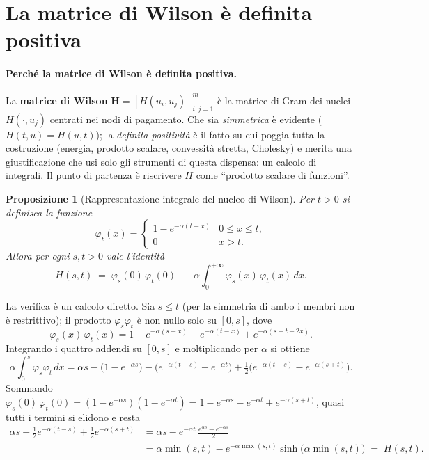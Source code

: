 \documentclass[11pt,a4paper]{article}
\theoremstyle{plain}
\newtheorem{proposizione}[teorema]{Proposizione}
\theoremstyle{definition}
\theoremstyle{remark}
\newcommand{\Hmat}{\mathbf{H}}
\begin{document}
\section{La matrice di Wilson è definita positiva}
\label{sec:dimostrazione}

\paragraph{Perch\'e la matrice di Wilson \`e definita positiva.}
La \textbf{matrice di Wilson} $\Hmat = [H(u_i,u_j)]_{i,j=1}^{m}$ \`e la matrice di Gram dei
nuclei $H(\cdot,u_j)$ centrati nei nodi di pagamento. Che sia \emph{simmetrica} \`e evidente
($H(t,u)=H(u,t)$); la \emph{definita positivit\`a} \`e il fatto su cui poggia tutta la
costruzione (energia, prodotto scalare, convessit\`a stretta, Cholesky) e merita una
giustificazione che usi solo gli strumenti di questa dispensa: un calcolo di integrali.
Il punto di partenza \`e riscrivere $H$ come ``prodotto scalare di funzioni''.

\begin{proposizione}[Rappresentazione integrale del nucleo di Wilson]
\label{prop:H-int}
Per $t>0$ si definisca la funzione
\[
  \varphi_t(x) =
  \begin{cases}
    1-e^{-\alpha(t-x)} & 0\le x\le t,\\[2pt]
    0 & x>t .
  \end{cases}
\]
Allora per ogni $s,t>0$ vale l'identit\`a
\begin{equation}
  H(s,t) \;=\; \varphi_s(0)\,\varphi_t(0)
  \;+\; \alpha\!\int_0^{+\infty}\!\varphi_s(x)\,\varphi_t(x)\,dx .
  \label{eq:H-int}
\end{equation}
\end{proposizione}

La verifica \`e un calcolo diretto. Sia $s\le t$ (per la simmetria di ambo i membri non \`e
restrittivo); il prodotto $\varphi_s\varphi_t$ \`e non nullo solo su $[0,s]$, dove
\[
  \varphi_s(x)\,\varphi_t(x)
  = 1 - e^{-\alpha(s-x)} - e^{-\alpha(t-x)} + e^{-\alpha(s+t-2x)} .
\]
Integrando i quattro addendi su $[0,s]$ e moltiplicando per $\alpha$ si ottiene
\[
  \alpha\!\int_0^{s}\!\varphi_s\varphi_t\,dx
  = \alpha s - \bigl(1-e^{-\alpha s}\bigr) - \bigl(e^{-\alpha(t-s)}-e^{-\alpha t}\bigr)
    + \tfrac12\bigl(e^{-\alpha(t-s)}-e^{-\alpha(s+t)}\bigr) .
\]
Sommando $\varphi_s(0)\,\varphi_t(0) = (1-e^{-\alpha s})(1-e^{-\alpha t})
= 1 - e^{-\alpha s} - e^{-\alpha t} + e^{-\alpha(s+t)}$, quasi tutti i termini si elidono e resta
\begin{align*}
  \alpha s - \tfrac12 e^{-\alpha(t-s)} + \tfrac12 e^{-\alpha(s+t)}
  &= \alpha s - e^{-\alpha t}\,\frac{e^{\alpha s}-e^{-\alpha s}}{2}\\
  &= \alpha\min(s,t) - e^{-\alpha\max(s,t)}\sinh\!\bigl(\alpha\min(s,t)\bigr)
  \;=\; H(s,t) .
\end{align*}
\end{document}
